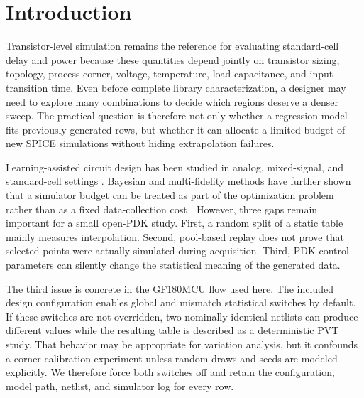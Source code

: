 \documentclass[preprint,12pt]{elsarticle}
\begin{document}
\section{Introduction}

Transistor-level simulation remains the reference for evaluating standard-cell delay and power because these quantities depend jointly on transistor sizing, topology, process corner, voltage, temperature, load capacitance, and input transition time. Even before complete library characterization, a designer may need to explore many combinations to decide which regions deserve a denser sweep. The practical question is therefore not only whether a regression model fits previously generated rows, but whether it can allocate a limited budget of new SPICE simulations without hiding extrapolation failures.

Learning-assisted circuit design has been studied in analog, mixed-signal, and standard-cell settings \cite{Fayazi_AI_AMS_Review_2021,Afacan_ML_AnalogRF_Review_2021,Mina_ML_AnalogIC_Review_2022,Klemme_CellLib_ML_DTCO_ICCAD_2020,Klemme_Reliability_CellLib_TCASI_2021}. Bayesian and multi-fidelity methods have further shown that a simulator budget can be treated as part of the optimization problem rather than as a fixed data-collection cost \cite{Lyu_Bayesian_Analog_2018,Zhang_MultiFidelity_BO_DAC_2019,He_Batched_MultiFidelity_BO_TCAD_2023}. However, three gaps remain important for a small open-PDK study. First, a random split of a static table mainly measures interpolation. Second, pool-based replay does not prove that selected points were actually simulated during acquisition. Third, PDK control parameters can silently change the statistical meaning of the generated data.

The third issue is concrete in the GF180MCU flow used here. The included design configuration enables global and mismatch statistical switches by default. If these switches are not overridden, two nominally identical netlists can produce different values while the resulting table is described as a deterministic PVT study. That behavior may be appropriate for variation analysis, but it confounds a corner-calibration experiment unless random draws and seeds are modeled explicitly. We therefore force both switches off and retain the configuration, model path, netlist, and simulator log for every row.
\end{document}
